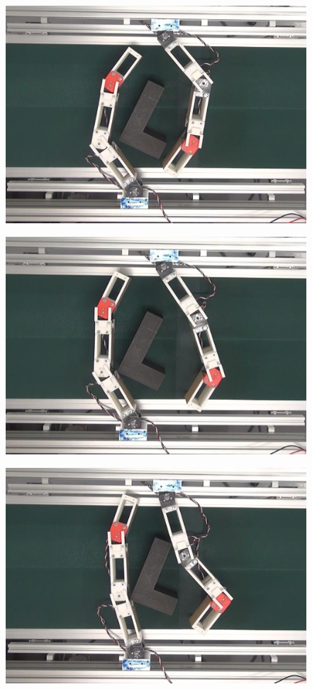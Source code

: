 \documentclass[a4paper,twoside,12pt,papersize, dvipdfmx]{iirthesis}
\begin{document}
\begin{figure}[b]
\centering
\begin{minipage}{0.249\hsize}
\centering
\includegraphics[width=0.98\hsize]{fig/4-manipulation-result/LShape/2-1.jpg}
\subcaption{}\label{}
\end{minipage}\hfill
\begin{minipage}{0.249\hsize}
\centering
\includegraphics[width=0.98\hsize]{fig/4-manipulation-result/LShape/2-2.jpg}
\subcaption{}\label{}
\end{minipage}\hfill
\begin{minipage}{0.249\hsize}
\centering
\includegraphics[width=0.98\hsize]{fig/4-manipulation-result/LShape/2-3.jpg}

\end{minipage}
\end{figure}
\end{document}
